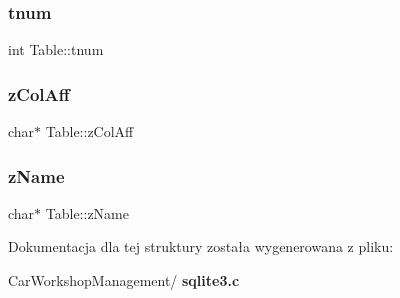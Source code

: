 \mbox{\label{struct_table_aebe1abbfb2fd4b5e5dff8e74a4f3c890}} 
\subsubsection{tnum}
{\footnotesize\ttfamily int Table\+::tnum}

\mbox{\label{struct_table_ac95c0c7b04f2c8367beb98d386d4228f}} 
\subsubsection{zColAff}
{\footnotesize\ttfamily char$\ast$ Table\+::z\+Col\+Aff}

\mbox{\label{struct_table_a20ca62607d6da596b1016b76cf677809}} 
\subsubsection{zName}
{\footnotesize\ttfamily char$\ast$ Table\+::z\+Name}



Dokumentacja dla tej struktury została wygenerowana z pliku\+:\begin{DoxyCompactItemize}
\item 
Car\+Workshop\+Management/\textbf{ sqlite3.\+c}\end{DoxyCompactItemize}
